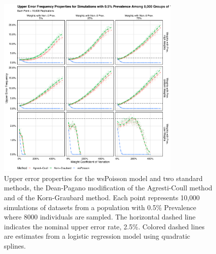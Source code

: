 \documentclass[AMA,STIX1COL]{WileyNJD-v2}
\begin{document}
\begin{figure}
\centering
\includegraphics[width=0.8\textwidth]{figures/perfect_upper_error_frequency_8000_groups_0_005_prev.pdf}
\caption{Upper error properties for the wsPoisson model and two standard methods, the Dean-Pagano modification of the Agresti-Coull method and of the Korn-Graubard method.
Each point represents 10,000 simulations of datasets from a population with 0.5\% Prevalence where 8000 individuals are sampled.
The horizontal dashed line indicates the nominal upper error rate, 2.5\%.
Colored dashed lines are estimates from a logistic regression model using quadratic splines.}
\label{fig:perfect_upper_error_frequency_8000_groups_0_005_prev}
\end{figure}
\end{document}
